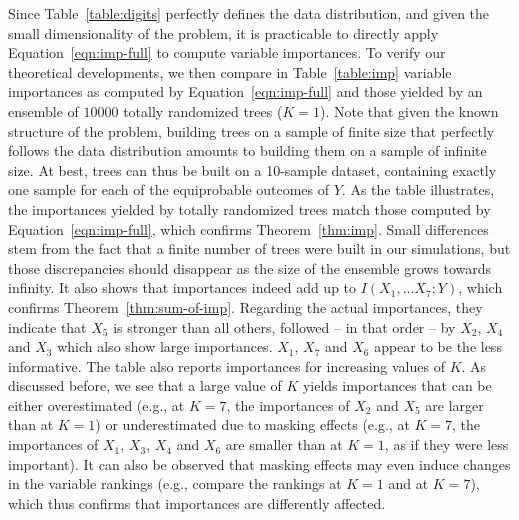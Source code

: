 Since Table~\ref{table:digits} perfectly defines the data distribution, and
given the small dimensionality of the problem, it is practicable to directly
apply Equation~\ref{eqn:imp-full} to compute variable importances. To verify our
theoretical developments, we then compare in Table~\ref{table:imp} variable
importances as computed by Equation~\ref{eqn:imp-full} and those yielded by an
ensemble of $10000$ totally randomized trees ($K=1$). Note that given the  known
structure of the problem, building trees on a sample of finite size  that
perfectly follows the data distribution amounts to building them on a sample of
infinite size. At best, trees can thus be built on a 10-sample dataset,
containing exactly one sample for each of the equiprobable outcomes of $Y$. As
the table illustrates, the importances yielded by totally randomized trees match
those computed by Equation~\ref{eqn:imp-full}, which confirms
Theorem~\ref{thm:imp}. Small differences stem from the fact that a finite number
of  trees were built in our simulations, but those discrepancies should
disappear as the size of the ensemble grows towards infinity. It also shows that
importances indeed add up to $I(X_1, ... X_7;Y)$, which confirms
Theorem~\ref{thm:sum-of-imp}.
Regarding the actual importances, they indicate that $X_5$ is stronger than all
others, followed -- in that order -- by $X_2$, $X_4$ and $X_3$ which also show
large importances. $X_1$, $X_7$ and $X_6$ appear to be the less informative. The
table also reports importances for increasing values of $K$. As discussed before,
we see that a large value of $K$ yields importances that can be either
overestimated (e.g., at $K=7$, the importances of $X_2$ and $X_5$ are larger
than at $K=1$) or underestimated due to masking effects (e.g., at $K=7$, the
importances of $X_1$, $X_3$, $X_4$ and $X_6$ are smaller than at $K=1$, as if
they were less important). It can also be observed that masking effects may even
induce changes in the variable rankings (e.g., compare the rankings at $K=1$ and
at $K=7$), which thus confirms that importances are differently affected.

